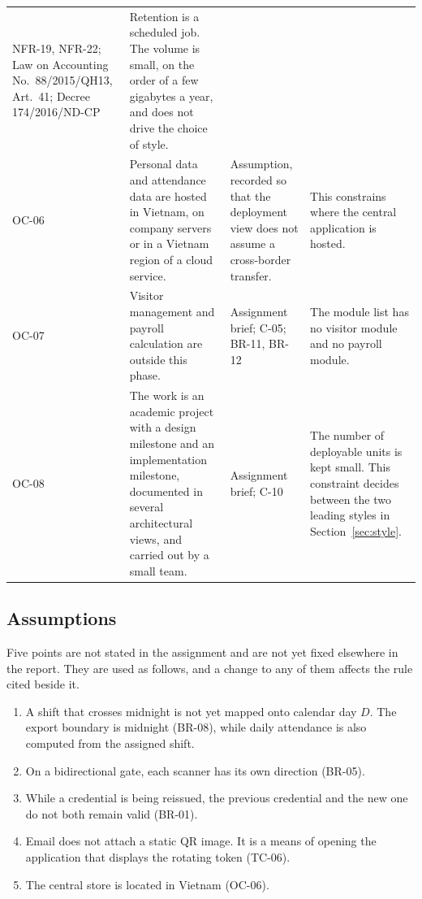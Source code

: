\begin{longtable}{@{}L{1.25cm}L{5.15cm}L{4.05cm}L{4.15cm}@{}}
NFR-19, NFR-22; Law on Accounting No.~88/2015/QH13, Art.~41; Decree 174/2016/ND-CP &
Retention is a scheduled job.
The volume is small, on the order of a few gigabytes a year, and does not drive the choice of style.\\
\addlinespace
OC-06 &
Personal data and attendance data are hosted in Vietnam, on company servers or in a Vietnam region of a cloud service. &
Assumption, recorded so that the deployment view does not assume a cross-border transfer. &
This constrains where the central application is hosted.\\
\addlinespace
OC-07 &
Visitor management and payroll calculation are outside this phase. &
Assignment brief; C-05; BR-11, BR-12 &
The module list has no visitor module and no payroll module.\\
\addlinespace
OC-08 &
The work is an academic project with a design milestone and an implementation milestone, documented in several architectural views, and carried out by a small team. &
Assignment brief; C-10 &
The number of deployable units is kept small.
This constraint decides between the two leading styles in Section~\ref{sec:style}.\\
\bottomrule
\end{longtable}

\subsection{Assumptions}
\label{sec:assumptions}

Five points are not stated in the assignment and are not yet fixed elsewhere in the report.
They are used as follows, and a change to any of them affects the rule cited beside it.

\begin{enumerate}
  \item A shift that crosses midnight is not yet mapped onto calendar day \(D\).
  The export boundary is midnight (BR-08), while daily attendance is also computed from the assigned shift.
  \item On a bidirectional gate, each scanner has its own direction (BR-05).
  \item While a credential is being reissued, the previous credential and the new one do not both remain valid (BR-01).
  \item Email does not attach a static QR image.
  It is a means of opening the application that displays the rotating token (TC-06).
  \item The central store is located in Vietnam (OC-06).
\end{enumerate}

